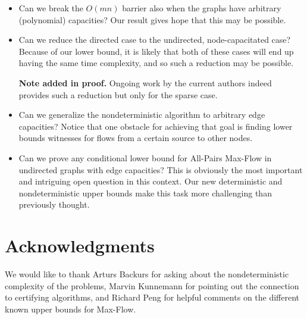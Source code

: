 \documentclass{toc}
\theoremstyle{plain}
\newcommand{\ProblemName}[1]{\textsf{#1}}
\newcommand{\MF}{\ProblemName{Max-Flow}\xspace}
\newcommand{\APMF}{\ProblemName{All-Pairs Max-Flow}\xspace}
\begin{document}
\begin{itemize}
\item Can we break the $O(mn)$ barrier also when the graphs have arbitrary (polynomial) capacities? Our result gives hope that this may be possible.

\item Can we reduce the directed case to the undirected, node-capacitated case? Because of our lower bound, it is likely that both of these cases will end up having the same time complexity, and so such a reduction may be possible.

\smallskip
\textbf{Note added in proof.}
Ongoing work by the current authors indeed provides such a reduction but only for the sparse case.
%

\item Can we generalize the nondeterministic algorithm to arbitrary edge capacities? Notice that one obstacle for achieving that goal is finding lower bounds witnesses for flows from a certain source to other nodes.

\item Can we prove any conditional lower bound for \APMF in undirected graphs with edge capacities? This is obviously the most important and intriguing open question in this context. Our new deterministic and nondeterministic upper bounds make this task more challenging than previously thought.
\end{itemize}

%
\section{Acknowledgments}   %
We would like to thank Arturs Backurs for asking about the nondeterministic complexity of the problems, Marvin Kunnemann for pointing out the connection to certifying algorithms, and Richard Peng for helpful comments on the different known upper bounds for \MF.




%
%
%
%

\end{document}
